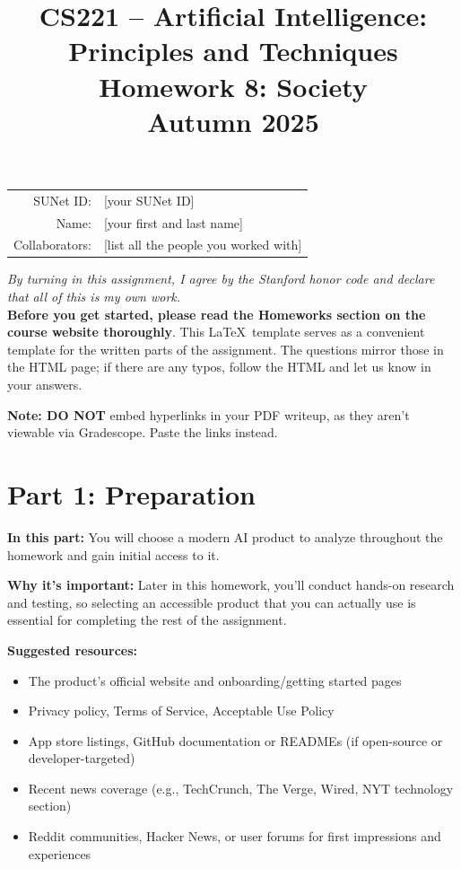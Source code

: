 \documentclass{article}
\title{\textbf{CS221 -- Artificial Intelligence: \\Principles and Techniques}\\Homework 8: Society\\Autumn 2025}
\date{}
\theoremstyle{case}
\theoremstyle{definition}
\begin{document}
\maketitle

\begin{center}
\begin{tabular}{rl}
SUNet ID: & [your SUNet ID] \\
Name: & [your first and last name] \\
Collaborators: & [list all the people you worked with]
\end{tabular}
\end{center}

\textit{By turning in this assignment, I agree by the Stanford honor code and declare that all of this is my own work.} \\

\textbf{Before you get started, please read the Homeworks section on the course website thoroughly}. This \LaTeX\ template serves as a convenient template for the written parts of the assignment. The questions mirror those in the HTML page; if there are any typos, follow the HTML and let us know in your answers.

\begin{framed}
\noindent \textbf{Note: DO NOT} embed hyperlinks in your PDF writeup, as they aren't viewable via Gradescope. Paste the links instead.
\end{framed}

\section*{Part 1: Preparation}

\textbf{In this part:} You will choose a modern AI product to analyze throughout the homework and gain initial access to it.

\vspace{2mm}

\textbf{Why it's important:} Later in this homework, you'll conduct hands-on research and testing, so selecting an accessible product that you can actually use is essential for completing the rest of the assignment.

\vspace{2mm}

\textbf{Suggested resources:}
\begin{itemize}
  \item The product's official website and onboarding/getting started pages
  \item Privacy policy, Terms of Service, Acceptable Use Policy
  \item App store listings, GitHub documentation or READMEs (if open-source or developer-targeted)
  \item Recent news coverage (e.g., TechCrunch, The Verge, Wired, NYT technology section)
  \item Reddit communities, Hacker News, or user forums for first impressions and experiences
\end{itemize}
\end{document}
